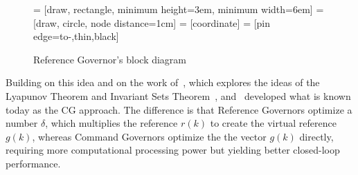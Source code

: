 \begin{figure}
  \centering
      = [draw, rectangle, minimum height=3em, minimum width=6em]
        = [draw, circle, node distance=1cm]
      = [coordinate]
   = [pin edge={to-,thin,black}]
  \caption{Reference Governor's block diagram}%
  \label{fig:rg-block-diagram}
\end{figure}

Building on this idea and on the work of~\textcite{kapasouris.athans.ea:design}, which
explores the ideas of the Lyapunov Theorem and Invariant Sets
Theorem~\parencite{blanchini.miani:set-theoretic}, \textcite{bemporad.casavola.ea:nonlinear}
and~\textcite{casavola.mosca.ea:robust} developed what is known today as the
\ac{CG} approach. 
The difference is that Reference Governors optimize a number \(\delta\), which multiplies the reference \(r(k)\) to create the virtual reference \(g(k)\), whereas Command Governors optimize the the vector \(g(k)\) directly,
 requiring more computational processing power but yielding better closed-loop performance.

